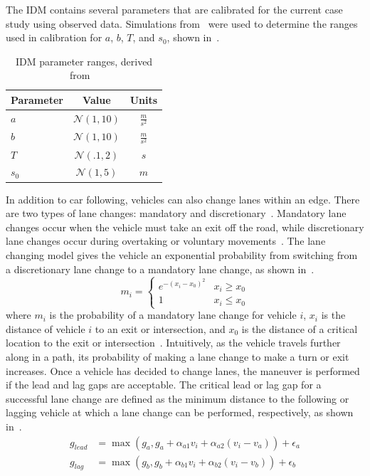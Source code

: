 \documentclass[final]{IEEEtran}
\begin{document}
The IDM contains several parameters that are calibrated for the current case study using observed data. Simulations from~\cite{treiberTrafficFlowDynamics2013} were used to determine the ranges used in calibration for $a$, $b$, $T$, and $s_0$, shown in~.
\begin{table}   
    \centering
    \begin{tabular}{ l  c  c }
        \toprule
         Parameter & Value & Units \\
         \midrule
         $a$ & $\mathcal{N}(1,10)$ & $\frac{m}{s^2}$ \\  
         $b$ & $\mathcal{N}(1,10)$ & $\frac{m}{s^2}$ \\
         $T$ & $\mathcal{N}(.1,2)$ & $s$ \\
         $s_0$ & $\mathcal{N}(1,5)$ & $m$\\
         \bottomrule
    \end{tabular}
    \label{tab:idm_params}
    \caption{IDM parameter ranges, derived from ~\cite{treiberTrafficFlowDynamics2013}}
\end{table}
In addition to car following, vehicles can also change lanes within an edge. There are two types of lane changes: mandatory and discretionary~\cite{garcia-doradoDesigningLargescaleInteractive2014}. Mandatory lane changes occur when the vehicle must take an exit off the road, while discretionary lane changes occur during overtaking or voluntary movements~\cite{garcia-doradoDesigningLargescaleInteractive2014}. The lane changing model gives the vehicle an exponential probability from switching from a discretionary lane change to a mandatory lane change, as shown in~.
\begin{equation}
    m_i = 
    \begin{cases} 
        e^{-(x_i - x_0)^2} & x_i \geq x_0 \\
        1 & x_i \leq x_0
        \label{eq:lane_changing}
    \end{cases}
\end{equation}
where $m_i$ is the probability of a mandatory lane change for vehicle $i$, $x_i$ is the distance of vehicle $i$ to an exit or intersection, and $x_0$ is the distance of a critical location to the exit or intersection~\cite{iqbalDevelopmentOriginDestination2014a, yangMicroscopicTrafficSimulator1996}. Intuitively, as the vehicle travels further along in a path, its probability of making a lane change to make a turn or exit increases. Once a vehicle has decided to change lanes, the maneuver is performed if the lead and lag gaps are acceptable. The critical lead or lag gap for a successful lane change are defined as the minimum distance to the following or lagging vehicle at which a lane change can be performed, respectively, as shown in~.
\begin{align}
    \label{eq:gap}
    g_{lead} &= \max(g_a, g_a + \alpha_{a1}v_i + \alpha_{a2}(v_i - v_a)) + \epsilon_a  \\ 
    g_{lag} &= \max(g_b, g_b + \alpha_{b1}v_i + \alpha_{b2}(v_i - v_b)) + \epsilon_b
\end{align}
\end{document}
